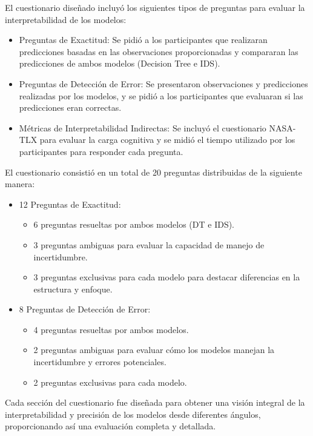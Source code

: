El cuestionario diseñado incluyó los siguientes tipos de preguntas para evaluar la interpretabilidad de los modelos:

\begin{itemize}
    \item Preguntas de Exactitud: Se pidió a los participantes que realizaran predicciones basadas en las observaciones proporcionadas y compararan las predicciones de ambos modelos (Decision Tree e IDS).
    \item Preguntas de Detección de Error: Se presentaron observaciones y predicciones realizadas por los modelos, y se pidió a los participantes que evaluaran si las predicciones eran correctas.
    \item Métricas de Interpretabilidad Indirectas: Se incluyó el cuestionario NASA-TLX para evaluar la carga cognitiva y se midió el tiempo utilizado por los participantes para responder cada pregunta.
\end{itemize}

El cuestionario consistió en un total de 20 preguntas distribuidas de la siguiente manera:
\begin{itemize}
    \item 12 Preguntas de Exactitud:
    \begin{itemize}
        \item 6 preguntas resueltas por ambos modelos (DT e IDS).
        \item 3 preguntas ambiguas para evaluar la capacidad de manejo de incertidumbre.
        \item 3 preguntas exclusivas para cada modelo para destacar diferencias en la estructura y enfoque.
    \end{itemize}
    \item 8 Preguntas de Detección de Error:
    \begin{itemize}
        \item 4 preguntas resueltas por ambos modelos.
        \item 2 preguntas ambiguas para evaluar cómo los modelos manejan la incertidumbre y errores potenciales.
        \item 2 preguntas exclusivas para cada modelo.
    \end{itemize}
\end{itemize}

Cada sección del cuestionario fue diseñada para obtener una visión integral de la interpretabilidad y precisión de los modelos desde diferentes ángulos, proporcionando así una evaluación completa y detallada.

